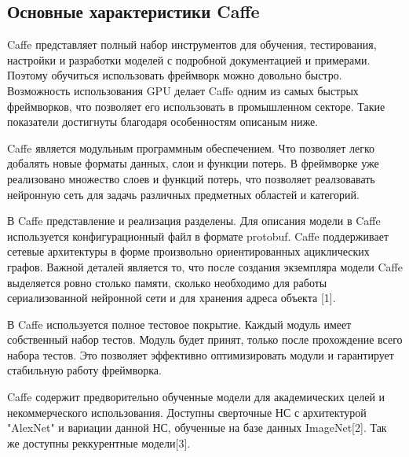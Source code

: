 \documentclass[a4paper,english,russian]{G2-105}
\begin{document}
\subsection{Основные характеристики Caffe}
\par Caffe представляет полный набор инструментов для обучения, тестирования, настройки и разработки моделей с подробной документацией и примерами. Поэтому обучиться использовать фреймворк можно довольно быстро. Возможность использования GPU делает Caffe одним из самых быстрых фреймворков, что позволяет его использовать в промышленном секторе. Такие показатели достигнуты благодаря особенностям описаным ниже.
\par Caffe является модульным программным обеспечением. Что позволяет легко добалять новые форматы данных, слои и функции потерь. В фреймворке уже реализовано множество слоев и функций потерь, что позволяет реалзовавать нейронную сеть для задачь различных предметных областей и категорий.
\par В Caffe представление и реализация разделены. Для описания модели в Caffe используется конфигурационный файл в формате protobuf. Caffe поддерживает сетевые архитектуры в форме произвольно ориентированных ациклических графов. Важной деталей является то, что после создания экземпляра модели Caffe выделяется ровно столько памяти, сколько необходимо для работы сериализованной нейронной сети и для хранения адреса объекта [1].
\par В Caffe используется полное тестовое покрытие. Каждый модуль имеет собственный набор тестов. Модуль будет принят, только после прохождение всего набора тестов. Это позволяет эффективно оптимизировать модули и гарантирует стабильную работу фреймворка.
\par Caffe содержит предворительно обученные модели для академических целей и некоммерческого использования. Доступны сверточные НС с архитектурой "AlexNet" и вариации данной НС, обученные на базе данных ImageNet[2]. Так же доступны реккурентные модели[3].
\end{document}
